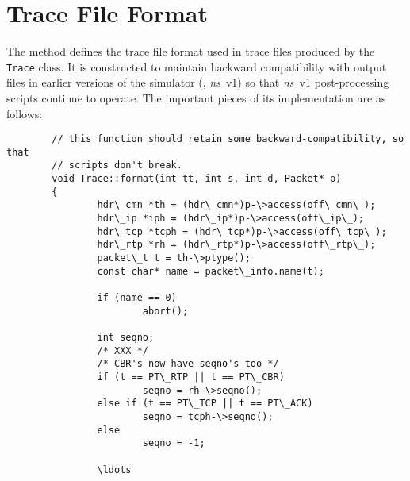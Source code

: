 \section{Trace File Format}
\label{sec:traceformat}

The  method defines the trace file format used
in trace files produced by the {\tt Trace} class.
It is constructed to maintain backward compatibility with output files
in earlier versions of the simulator (\ie, \emph{ns}~v1) so that \emph{ns}~v1
post-processing scripts continue to operate.
The important pieces of its implementation are as follows:
\begin{verbatim}
        // this function should retain some backward-compatibility, so that
        // scripts don't break.
        void Trace::format(int tt, int s, int d, Packet* p)
        {
                hdr\_cmn *th = (hdr\_cmn*)p-\>access(off\_cmn\_);
                hdr\_ip *iph = (hdr\_ip*)p-\>access(off\_ip\_);
                hdr\_tcp *tcph = (hdr\_tcp*)p-\>access(off\_tcp\_);
                hdr\_rtp *rh = (hdr\_rtp*)p-\>access(off\_rtp\_);
                packet\_t t = th-\>ptype();
                const char* name = packet\_info.name(t);

                if (name == 0)
                        abort();

                int seqno;
                /* XXX */
                /* CBR's now have seqno's too */
                if (t == PT\_RTP || t == PT\_CBR)
                        seqno = rh-\>seqno();
                else if (t == PT\_TCP || t == PT\_ACK)
                        seqno = tcph-\>seqno();
                else
                        seqno = -1;

                \ldots


\end{verbatim}
